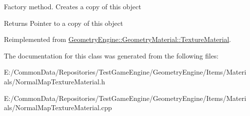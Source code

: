 Factory method. Creates a copy of this object \begin{DoxyReturn}{Returns}
Pointer to a copy of this object 
\end{DoxyReturn}


Reimplemented from \mbox{\hyperlink{class_geometry_engine_1_1_geometry_material_1_1_texture_material_ace905cf02deb41ad8aa422ef2fb9070f}{Geometry\+Engine\+::\+Geometry\+Material\+::\+Texture\+Material}}.



The documentation for this class was generated from the following files\+:\begin{DoxyCompactItemize}
\item 
E\+:/\+Common\+Data/\+Repositories/\+Test\+Game\+Engine/\+Geometry\+Engine/\+Items/\+Materials/Normal\+Map\+Texture\+Material.\+h\item 
E\+:/\+Common\+Data/\+Repositories/\+Test\+Game\+Engine/\+Geometry\+Engine/\+Items/\+Materials/Normal\+Map\+Texture\+Material.\+cpp\end{DoxyCompactItemize}
